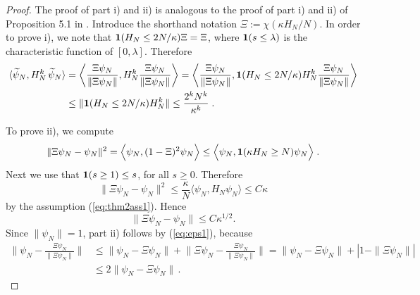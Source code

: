 \documentclass[11pt]{article}
\newcommand{\wt}{\widetilde}
\begin{document}
\begin{proof}
The proof of part i) and ii) is analogous to the proof of part i)
and ii) of Proposition 5.1 in \cite{ESY2}. Introduce the shorthand
notation $\Xi := \chi (\kappa H_N /N)$.
In order to prove i), we note that $ {\bf 1}
(H_N \leq 2 N/\kappa) \Xi = \Xi$, where ${\bf 1} (s
\leq \lambda) $ is the characteristic function of $[0, \lambda]$.
Therefore
\begin{equation}
\begin{split}
\langle \wt \psi_N , H_N^k \, \wt \psi_N \rangle &= \left\langle
\frac{\Xi \psi_N}{\| \Xi \psi_N \|}, H^k_N \frac{\Xi \psi_N}{\| \Xi
\psi_N \|} \right\rangle = \left\langle \frac{\Xi \psi_N}{\| \Xi
\psi_N \|}, {\bf 1} (H_N \leq 2 N /\kappa) H^k_N \frac{\Xi
\psi_N}{\| \Xi \psi_N \|} \right\rangle \\ &\leq \|{\bf 1} (H_N \leq
2N /\kappa) H^k_N\| \leq \frac{2^k N^k}{\kappa^k} \; .
\end{split}
\end{equation}

To prove ii), we compute
\begin{equation}
\| \Xi \psi_N - \psi_N \|^2 =  \Big\langle\psi_N , ( 1 - \Xi )^2
\psi_N\Big\rangle \leq \Big\langle\psi_N, {\bf 1} ( \kappa H_N \geq
N) \psi_N\Big\rangle\;.
 \end{equation}
Next we use that ${\bf 1} (s \geq 1) \leq s$, for all $s \geq 0$.
Therefore
\begin{equation}
\| \Xi \psi_N - \psi_N \|^2 \leq \frac{\kappa}{N} \langle\psi_N ,
H_N \psi_N\rangle \leq C \kappa
\end{equation}
by the assumption (\ref{eq:thm2ass1}). Hence
\begin{equation}\label{eq:eps1}
\| \Xi \psi_N - \psi_N \| \leq C \kappa^{1/2}.
\end{equation}
Since  $\| \psi_N \|=1$, part ii) follows by (\ref{eq:eps1}),
because
\begin{equation}
\begin{split}
\Big\| \psi_N - \frac{ \Xi \psi_N}{\| \Xi \psi_N \|} \Big\| &\leq \|
\psi_N - \Xi \psi_N \| + \Big\| \Xi \psi_N -\frac{ \Xi \psi_N}{\|
\Xi \psi_N \|} \Big\| = \| \psi_N - \Xi \psi_N \| + | 1 - \| \Xi
\psi_N \| | \\ &\leq 2 \| \psi_N - \Xi \psi_N \| \, .
\end{split}
\end{equation}

\medskip


\end{proof}
\end{document}
